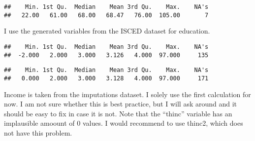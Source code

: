 \documentclass[
]{article}
\newenvironment{Shaded}{\begin{snugshade}}{\end{snugshade}}
\newcommand{\CommentTok}[1]{\textcolor[rgb]{0.56,0.35,0.01}{\textit{#1}}}
\newcommand{\ConstantTok}[1]{\textcolor[rgb]{0.00,0.00,0.00}{#1}}
\newcommand{\DecValTok}[1]{\textcolor[rgb]{0.00,0.00,0.81}{#1}}
\newcommand{\FunctionTok}[1]{\textcolor[rgb]{0.00,0.00,0.00}{#1}}
\newcommand{\NormalTok}[1]{#1}
\newcommand{\OtherTok}[1]{\textcolor[rgb]{0.56,0.35,0.01}{#1}}
\newcommand{\SpecialCharTok}[1]{\textcolor[rgb]{0.00,0.00,0.00}{#1}}
\newcommand{\StringTok}[1]{\textcolor[rgb]{0.31,0.60,0.02}{#1}}
\begin{document}
\begin{verbatim}
##    Min. 1st Qu.  Median    Mean 3rd Qu.    Max.    NA's 
##   22.00   61.00   68.00   68.47   76.00  105.00       7
\end{verbatim}

I use the generated variables from the ISCED dataset for education.

\begin{Shaded}
\end{Shaded}

\begin{verbatim}
##    Min. 1st Qu.  Median    Mean 3rd Qu.    Max.    NA's 
##  -2.000   2.000   3.000   3.126   4.000  97.000     135
\end{verbatim}

\begin{Shaded}
\end{Shaded}

\begin{verbatim}
##    Min. 1st Qu.  Median    Mean 3rd Qu.    Max.    NA's 
##   0.000   2.000   3.000   3.128   4.000  97.000     171
\end{verbatim}

Income is taken from the imputations dataset. I solely use the first
calculation for now. I am not sure whether this is best practice, but I
will ask around and it should be easy to fix in case it is not. Note
that the ``thinc'' variable has an implausible amoount of 0 values. I
would recommend to use thinc2, which does not have this problem.
\end{document}
